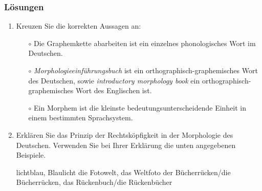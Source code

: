 

\begin{frame}
	\frametitle{Lösungen}

\begin{enumerate}
	\item Kreuzen Sie die korrekten Aussagen an: %
	
	\begin{itemize}
	\item[$\circ$] Die Graphemkette abarbeiten ist ein einzelnes phonologisches Wort im Deutschen.
	\item[$\circ$] \emph{Morphologieeinführungsbuch} ist ein orthographisch-graphemisches Wort des Deutschen, sowie \emph{introductory morphology book} ein orthographisch-graphemisches Wort des Englischen ist.
	\item[$\circ$] Ein Morphem ist die kleinste bedeutungsunterscheidende Einheit in einem bestimmten Sprachsystem.
	\item[\alertgreen{$\checkmark$}] 
\end{itemize}
	
	\item Erklären Sie das Prinzip der Rechtsköpfigkeit in der Morphologie des Deutschen. Verwenden Sie bei Ihrer Erklärung die unten angegebenen Beispiele.%
	
	\settowidth{}
		\eal
			\ex lichtblau, Blaulicht 
			\ex die Fotowelt, das Weltfoto 
			\ex der Bücherrücken/die Bücherrücken, das Rückenbuch/die Rückenbücher 
		\zl		
\end{enumerate}

\end{frame}


